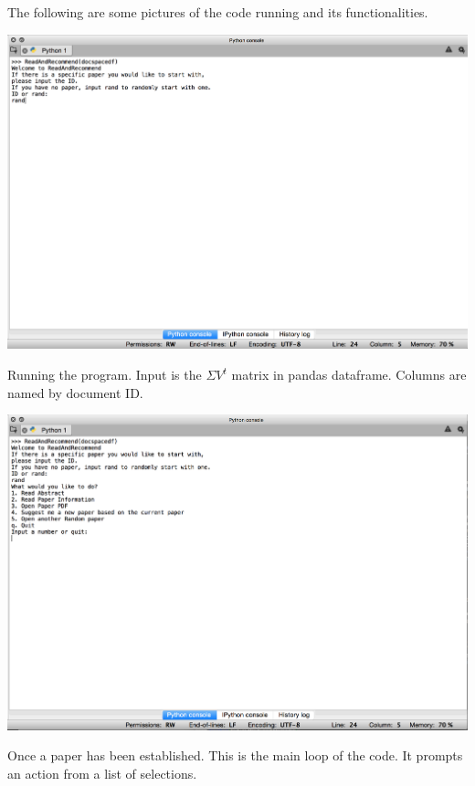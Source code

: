 \documentclass [12pt]{article}
\begin{document}
The following are some pictures of the code running and its functionalities. 

\begin{center}

\includegraphics[scale = .35]{sshot1}

\end{center}

Running the program. Input is the $\Sigma V^t$ matrix in pandas dataframe. Columns are named by document ID. 

\begin{center}

\includegraphics[scale = .35]{sshot2}

\end{center}

Once a paper has been established. This is the main loop of the code. It prompts an action from a list of selections. 
\end{document}
